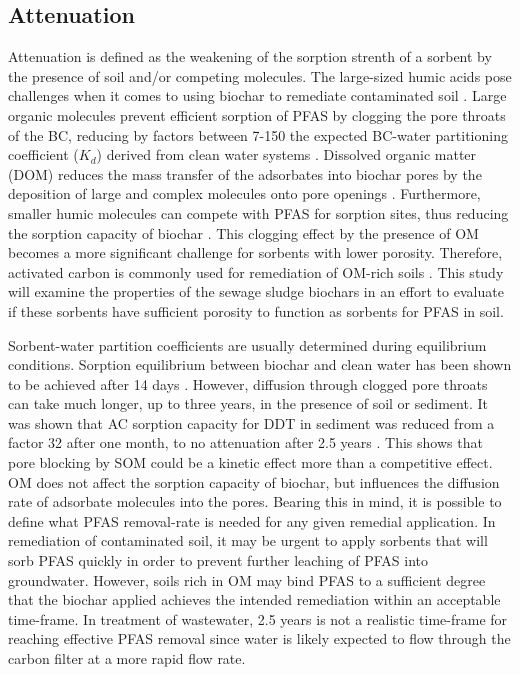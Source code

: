 \subsection{Attenuation}
Attenuation is defined as the weakening of the sorption strenth of a sorbent by the presence of soil and/or competing molecules. The large-sized humic acids pose challenges when it comes to using biochar to remediate contaminated soil  \citep{mahinroosta2020review}. Large organic molecules prevent efficient sorption of PFAS by clogging the pore throats of the BC, reducing by factors between 7-150 the expected BC-water partitioning coefficient ($K_d$) derived from clean water systems \citep{hale2009sorption, Teixido2013, cornelissen2004sorption}. Dissolved organic matter (DOM) reduces the mass transfer of the adsorbates into biochar pores by the deposition of large and complex molecules onto pore openings \citep{pignatello2006effect}. Furthermore, smaller humic molecules can compete with PFAS for sorption sites, thus reducing the sorption capacity of biochar \citep{du2014adsorption}. This clogging effect by the presence of OM becomes a more significant challenge for sorbents with lower porosity. Therefore, activated carbon is commonly used for remediation of OM-rich soils \citep{Sormo2021}. This study will examine the properties of the sewage sludge biochars in an effort to evaluate if these sorbents have sufficient porosity to function as sorbents for PFAS in soil. 

Sorbent-water partition coefficients are usually determined during equilibrium conditions. Sorption equilibrium between biochar and clean water has been shown to be achieved after 14 days \citep{Kupryianchyk2016b}. However, diffusion through clogged pore throats can take much longer, up to three years, in the presence of soil or sediment. It was shown that AC sorption capacity for DDT in sediment was reduced from a factor 32 after one month, to no attenuation after 2.5 years \citep{hale2009sorption}. This shows that pore blocking by SOM could be a kinetic effect more than a competitive effect. OM does not affect the sorption capacity of biochar, but influences the diffusion rate of adsorbate molecules into the pores. Bearing this in mind, it is possible to define what PFAS removal-rate is needed for any given remedial application. In remediation of contaminated soil, it may be urgent to apply sorbents that will sorb PFAS quickly in order to prevent further leaching of PFAS into groundwater. However, soils rich in OM may bind PFAS to a sufficient degree that the biochar applied achieves the intended remediation within an acceptable time-frame. In treatment of wastewater, 2.5 years is not a realistic time-frame for reaching effective PFAS removal since water is likely expected to flow through the carbon filter at a more rapid flow rate. 

